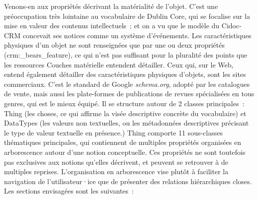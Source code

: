 \documentclass[a4paper,12pt, twoside]{book}
\begin{document}
Venons-en aux propriétés décrivant la matérialité de l’objet. C’est une préoccupation très lointaine au vocabulaire de Dublin Core, qui se focalise sur la mise en valeur des contenus intellectuels~; et on a vu que le modèle du Cidoc-CRM concevait ses notices comme un système d’événements. Les caractéristiques physiques d’un objet ne sont renseignées que par une ou deux propriétés (\textsf{crm:\_bears\_feature}), ce qui n’est pas suffisant pour la pluralité des points que les ressources \textsf{Couches matérielle} entendent détailler. Ceux qui, sur le Web, entend également détailler des caractéristiques physiques d’objets, sont les sites commerciaux. C’est le standard de Google \textit{schema.org}, adopté par les catalogues de vente, mais aussi les plate-formes de publications de revues spécialisées en tous genres, qui est le mieux équipé. Il se structure autour de 2 classes principales~: \textsf{Thing} (les choses, ce qui affirme la visée descriptive concrète du vocabulaire) et \textsf{DataTypes} (les valeurs non textuelles, ou les métadonnées descriptives précisant le type de valeur textuelle en présence.) \textsf{Thing} comporte 11 sous-classes thématiques principales, qui contiennent de multiples propriétés organisées en arborescence autour d’une notion conceptuelle. Ces propriétés ne sont toutefois pas exclusives aux notions qu’elles décrivent, et peuvent se retrouver à de multiples reprises. L’organisation en arborescence vise plutôt à faciliter la navigation de l’utilisateur·ice que de présenter des relations hiérarchiques closes. Les sections envisagées sont les suivantes~:
\end{document}
